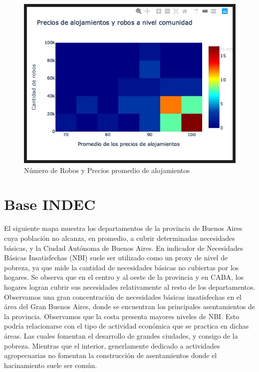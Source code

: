 \documentclass[11pt, spanish]{article}
\begin{document}
\begin{figure}[hbtp]
\caption{Número de Robos y Precios promedio de alojamientos}
\centering
\includegraphics[width=12cm]{Robpre.jpg}
\end{figure}
\clearpage

\section{Base INDEC}
\indent El siguiente mapa muestra los departamentos de la provincia de Buenos Aires  cuya población no alcanza, en promedio, a cubrir determinadas necesidades básicas, y la Ciudad Autónoma de Buenos Aires. En indicador de Necesidades Básicas Insatisfechas (NBI) suele ser utilizado como un proxy de nivel de pobreza, ya que mide la cantidad de necesidades básicas no cubiertas por los hogares. Se observa que en el centro y al oeste de la provincia y en CABA, los hogares logran cubrir sus necesidades relativamente al resto de los departamentos. Observamos una gran concentración de necesidades básicas insatisfechas en el área del Gran Buenos Aires, donde se encuentran los principales asentamientos de la provincia. 
Observamos que la costa presenta mayores niveles de NBI. Esto podría relacionarse con el tipo de actividad económica que se practica en dichas áreas. Las cuales fomentan el desarrollo de grandes ciudades, y consigo de la pobreza. Mientras que el interior, generlamente dedicado a actividades agropecuarias no fomentan la construcción de asentamientos donde el hacinamiento suele ser común.\\ 
\end{document}
